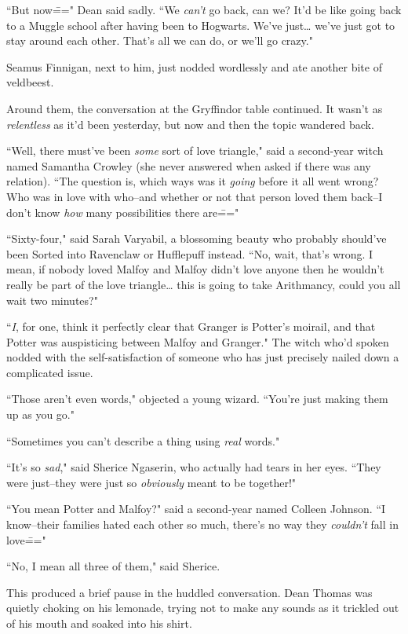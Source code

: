 ``But now\===" Dean said sadly. ``We \emph{can't} go back, can we? It'd be like going back to a Muggle school after having been to Hogwarts. We've just{\ldots} we've just got to stay around each other. That's all we can do, or we'll go crazy."

Seamus Finnigan, next to him, just nodded wordlessly and ate another bite of veldbeest.

Around them, the conversation at the Gryffindor table continued. It wasn't as \emph{relentless} as it'd been yesterday, but now and then the topic wandered back.

``Well, there must've been \emph{some} sort of love triangle," said a second-year witch named Samantha Crowley (she never answered when asked if there was any relation). ``The question is, which ways was it \emph{going} before it all went wrong? Who was in love with who\---and whether or not that person loved them back\---I don't know \emph{how} many possibilities there are\==="

``Sixty-four," said Sarah Varyabil, a blossoming beauty who probably should've been Sorted into Ravenclaw or Hufflepuff instead. ``No, wait, that's wrong. I mean, if nobody loved Malfoy and Malfoy didn't love anyone then he wouldn't really be part of the love triangle{\ldots} this is going to take Arithmancy, could you all wait two minutes?"

``\emph{I}, for one, think it perfectly clear that Granger is Potter's moirail, and that Potter was auspisticing between Malfoy and Granger." The witch who'd spoken nodded with the self-satisfaction of someone who has just precisely nailed down a complicated issue.

``Those aren't even words," objected a young wizard. ``You're just making them up as you go."

``Sometimes you can't describe a thing using \emph{real} words."

``It's so \emph{sad}," said Sherice Ngaserin, who actually had tears in her eyes. ``They were just\---they were just so \emph{obviously} meant to be together!"

``You mean Potter and Malfoy?" said a second-year named Colleen Johnson. ``I know\---their families hated each other so much, there's no way they \emph{couldn't} fall in love\==="

``No, I mean all three of them," said Sherice.

This produced a brief pause in the huddled conversation. Dean Thomas was quietly choking on his lemonade, trying not to make any sounds as it trickled out of his mouth and soaked into his shirt.

